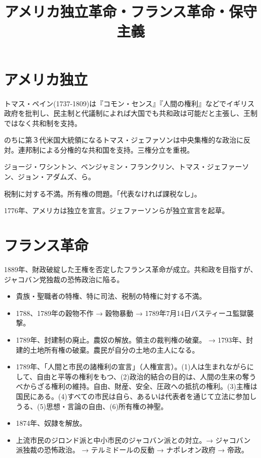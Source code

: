 \documentclass[uplatex,dvipdfmx]{jsarticle} \usepackage{mystyle}%
\title{アメリカ独立革命・フランス革命・保守主義}
\begin{document}
\maketitle


\section{アメリカ独立}

トマス・ペイン(1737-1809)は『コモン・センス』『人間の権利』などでイギリス政府を批判し、民主制と代議制によれば大国でも共和政は可能だと主張し、王制ではなく共和制を支持。

のちに第３代米国大統領になるトマス・ジェファソンは中央集権的な政治に反対。連邦制による分権的な共和国を支持。三権分立を重視。


ジョージ・ワシントン、ベンジャミン・フランクリン、トマス・ジェファーソン、ジョン・アダムズ、ら。

税制に対する不満。所有権の問題。「代表なければ課税なし」。




1776年、アメリカは独立を宣言。ジェファーソンらが独立宣言を起草。


\section{フランス革命}

1889年、財政破綻した王権を否定したフランス革命が成立。共和政を目指すが、ジャコバン党独裁の恐怖政治に陥る。

\begin{itemize}
\item 貴族・聖職者の特権、特に司法、税制の特権に対する不満。
\item 1788、1789年の穀物不作 → 穀物暴動 → 1789年7月14日バスティーユ監獄襲撃。
\item 1789年、封建制の廃止。農奴の解放。領主の裁判権の破棄。 → 1793年、封建的土地所有権の破棄。農民が自分の土地の主人になる。
\item 1789年、「人間と市民の諸権利の宣言」（人権宣言）。(1)人は生まれながらにして、自由と平等の権利をもつ、(2)政治的結合の目的は、人間の生来の奪うべからざる権利の維持。自由、財産、安全、圧政への抵抗の権利。(3)主権は国民にある。(4)すべての市民は自ら、あるいは代表者を通じて立法に参加しうる、(5)思想・言論の自由、(6)所有権の神聖。
\item 1874年、奴隷を解放。
\item 上流市民のジロンド派と中小市民のジャコバン派との対立。→ ジャコバン派独裁の恐怖政治。 → テルミドールの反動 → ナポレオン政府 → 帝政。
\end{itemize}
\end{document}
